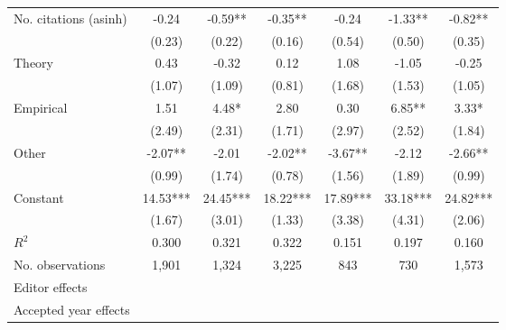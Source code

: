 \begin{table}
\begin{threeparttable}
\begin{tabular}{p{3.78cm}S@{}S@{}S@{}S@{}S@{}S@{}}
            No. citations (asinh)         &       -0.24   &       -0.59** &       -0.35** &       -0.24   &       -1.33** &       -0.82** \\
                                          &      (0.23)   &      (0.22)   &      (0.16)   &      (0.54)   &      (0.50)   &      (0.35)   \\
            Theory                        &        0.43   &       -0.32   &        0.12   &        1.08   &       -1.05   &       -0.25   \\
                                          &      (1.07)   &      (1.09)   &      (0.81)   &      (1.68)   &      (1.53)   &      (1.05)   \\
            Empirical                     &        1.51   &        4.48*  &        2.80   &        0.30   &        6.85** &        3.33*  \\
                                          &      (2.49)   &      (2.31)   &      (1.71)   &      (2.97)   &      (2.52)   &      (1.84)   \\
            Other                         &       -2.07** &       -2.01   &       -2.02** &       -3.67** &       -2.12   &       -2.66** \\
                                          &      (0.99)   &      (1.74)   &      (0.78)   &      (1.56)   &      (1.89)   &      (0.99)   \\
            Constant                      &       14.53***&       24.45***&       18.22***&       17.89***&       33.18***&       24.82***\\
                                          &      (1.67)   &      (3.01)   &      (1.33)   &      (3.38)   &      (4.31)   &      (2.06)   \\
            \midrule
            \(R^2\)                       &       0.300   &       0.321   &       0.322   &       0.151   &       0.197   &       0.160   \\
            No. observations              &       1,901   &       1,324   &       3,225   &         843   &         730   &       1,573   \\
            \midrule
            Editor effects       &           {}   &           {}   &           {}   &           {}   &           {}   &           {}   \\
            Accepted year effects         &           {}   &           {}   &               &           {}   &           {}   &               \\

\end{tabular}
\end{threeparttable}
\end{table}
